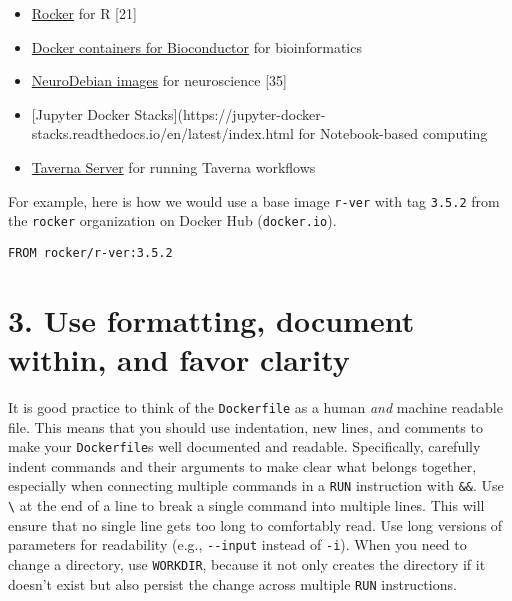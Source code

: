 \documentclass[10pt,letterpaper]{article}
\providecommand{\tightlist}{%
  \setlength{\itemsep}{0pt}\setlength{\parskip}{0pt}}
\begin{document}
\begin{itemize}
\tightlist
\item
  \href{https://www.rocker-project.org/}{Rocker} for R {[}21{]}
\item
  \href{https://bioconductor.org/help/docker/}{Docker containers for
  Bioconductor} for bioinformatics
\item
  \href{https://hub.docker.com/_/neurodebian}{NeuroDebian images} for
  neuroscience {[}35{]}
\item
  {[}Jupyter Docker
  Stacks{]}(https://jupyter-docker-stacks.readthedocs.io/en/latest/index.html
  for Notebook-based computing
\item
  \href{https://hub.docker.com/r/taverna/taverna-server}{Taverna Server}
  for running Taverna workflows
\end{itemize}

For example, here is how we would use a base image \texttt{r-ver} with
tag \texttt{3.5.2} from the \texttt{rocker} organization on Docker Hub
(\texttt{docker.io}).

\begin{verbatim}
FROM rocker/r-ver:3.5.2
\end{verbatim}

\hypertarget{use-formatting-document-within-and-favor-clarity}{%
\section{3. Use formatting, document within, and favor
clarity}\label{use-formatting-document-within-and-favor-clarity}}

  \label{rule:formatting} 

It is good practice to think of the \texttt{Dockerfile} as a human
\emph{and} machine readable file. This means that you should use
indentation, new lines, and comments to make your \texttt{Dockerfile}s
well documented and readable. Specifically, carefully indent commands
and their arguments to make clear what belongs together, especially when
connecting multiple commands in a \texttt{RUN} instruction with
\texttt{\&\&}. Use \texttt{\textbackslash{}} at the end of a line to
break a single command into multiple lines. This will ensure that no
single line gets too long to comfortably read. Use long versions of
parameters for readability (e.g., \texttt{-\/-input} instead of
\texttt{-i}). When you need to change a directory, use \texttt{WORKDIR},
because it not only creates the directory if it doesn't exist but also
persist the change across multiple \texttt{RUN} instructions.
\end{document}
